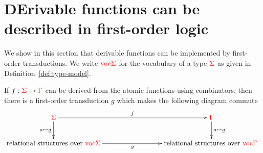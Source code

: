 
\section{DErivable functions can be described in first-order logic}
\label{sec:to-logic}
We show in this section that derivable functions can be implemented by first-order transductions. We write ${\color{red}{\mathrm{voc}}}{\color{red}{\Sigma}}$ for the vocabulary of a type ${\color{red}{\Sigma}}$ as given in Definition~\ref{def:type-model}.

\begin{proposition}\label{prop:to-logic} If $f : {\color{red}{\Sigma}} \to {\color{red}{\Gamma}}$ can be derived from the atomic functions using combinators, then there is a first-order transduction $g$ 
    which makes the following diagram commute
    \begin{align*}
        \xymatrix@C=3cm{
            \rSigma \ar[d]_{a \mapsto \underline a}\ar[r]^f &  \rGamma \ar[d]^{a \mapsto \underline a} \\
            \text{relational structures over $\voctype \rSigma$} \ar[r]_g &  \text{relational structures over $\voctype \rGamma$}.
        } 
    \end{align*}    
\end{proposition}
    
